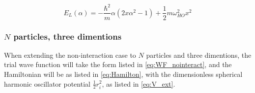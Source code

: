 \documentclass[norsk,a4paper,12pt]{article}
\begin{document}
\begin{equation}
E_L(\alpha) = -\frac{\hbar^2}{m} \alpha (2x\alpha^2 -1) + \frac{1}{2} m\omega_{HO}^2x^2
\end{equation}
\fi

\subsubsection{$N$ particles, three dimentions}

When extending the non-interaction case to $N$ particles and three dimentions, the trial wave function will take the form listed in \ref{eq:WF_nointeract}, and the Hamiltonian will be as listed in \ref{eq:Hamilton}, with the dimensionless spherical harmonic oscillator potential $\frac{1}{2}r_i^2$, as listed in \ref{eq:V_ext}.

\end{document}
